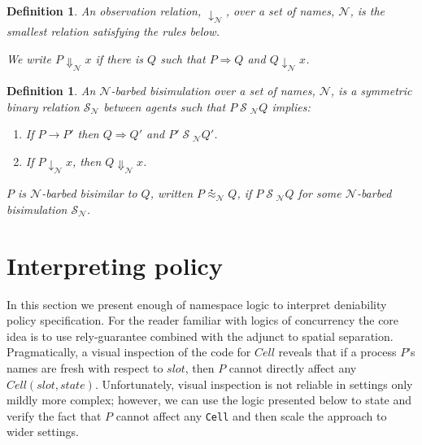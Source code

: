 \documentclass[submission,copyright,creativecommons]{eptcs}
\newcommand{\id}[1]{\texttt{#1}}
\newcommand{\juxtap}{\mathbin{\id{|}}}
\newcommand{\nameeq}{\mathbin{\equiv_N}}
\newcommand{\binpar}[2]{#1 \juxtap #2}
\newcommand{\outputp}[2]{#1 ! ( * #2 )}
\newcommand{\red}{\rightarrow}
\newcommand{\wred}{\Rightarrow}
\newcommand{\rel}[1]{\;{\mathcal #1}\;} %
\newcommand{\wbbisim}{\stackrel{\centerdot}{\approx}} %
\newtheorem{defn}[thm]{Definition}
\numberwithin{equation}{subsection}
\begin{document}
\begin{defn}
An \emph{observation relation}, $\downarrow_{\mathcal N}$, over a set
of names, $\mathcal N$, is the smallest relation satisfying the rules
below.


We write $P \Downarrow_{\mathcal N} x$ if there is $Q$ such that 
$P \wred Q$ and $Q \downarrow_{\mathcal N} x$.
\end{defn}

\begin{defn}
An  ${\mathcal N}$-\emph{barbed bisimulation} over a set of names, ${\mathcal N}$, is a symmetric binary relation 
${\mathcal S}_{\mathcal N}$ between agents such that $P\rel{S}_{\mathcal N}Q$ implies:
\begin{enumerate}
\item If $P \red P'$ then $Q \wred Q'$ and $P'\rel{S}_{\mathcal N} Q'$.
\item If $P\downarrow_{\mathcal N} x$, then $Q\Downarrow_{\mathcal N} x$.
\end{enumerate}
$P$ is ${\mathcal N}$-barbed bisimilar to $Q$, written
$P \wbbisim_{\mathcal N} Q$, if $P \rel{S}_{\mathcal N} Q$ for some ${\mathcal N}$-barbed bisimulation ${\mathcal S}_{\mathcal N}$.
\end{defn}

\section{Interpreting policy}

In this section we present enough of namespace logic to interpret
deniability policy specification. For the reader familiar with logics
of concurrency the core idea is to use rely-guarantee combined with
the adjunct to spatial separation. Pragmatically, a visual inspection
of the code for $Cell$ reveals that if a process $P$'s names are fresh
with respect to $slot$, then $P$ cannot directly affect any $Cell(
slot, state )$. Unfortunately, visual inspection is not reliable in
settings only mildly more complex; however, we can use the logic
presented below to state and verify the fact that $P$ cannot affect
any {\tt Cell} and then scale the approach to wider settings.
\end{document}
